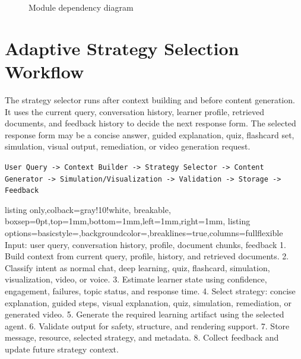 \begin{figure}[H]
\centering
{}
\caption{Module dependency diagram}
\label{fig:module-dependency}
\end{figure}

\section{Adaptive Strategy Selection Workflow}

The strategy selector runs after context building and before content generation. It uses the current query, conversation history, learner profile, retrieved documents, and feedback history to decide the next response form. The selected response form may be a concise answer, guided explanation, quiz, flashcard set, simulation, visual output, remediation, or video generation request.

\begin{center}
\texttt{User Query -> Context Builder -> Strategy Selector -> Content Generator -> Simulation/Visualization -> Validation -> Storage -> Feedback}
\end{center}

\begin{tcblisting}{listing only,colback=gray!10!white, breakable, boxsep=0pt,top=1mm,bottom=1mm,left=1mm,right=1mm,
listing options={basicstyle=\footnotesize\ttfamily,backgroundcolor=\color{gray!20},breaklines=true,columns=fullflexible}}
Input: user query, conversation history, profile, document chunks, feedback
1. Build context from current query, profile, history, and retrieved documents.
2. Classify intent as normal chat, deep learning, quiz, flashcard, simulation, visualization, video, or voice.
3. Estimate learner state using confidence, engagement, failures, topic status, and response time.
4. Select strategy: concise explanation, guided steps, visual explanation, quiz, simulation, remediation, or generated video.
5. Generate the required learning artifact using the selected agent.
6. Validate output for safety, structure, and rendering support.
7. Store message, resource, selected strategy, and metadata.
8. Collect feedback and update future strategy context.
\end{tcblisting}

